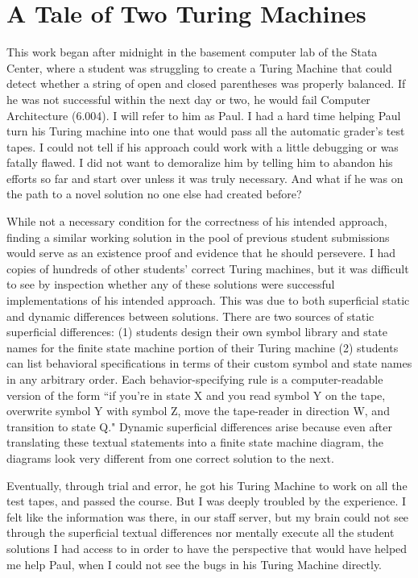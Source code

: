 \section{A Tale of Two Turing Machines}

This work began after midnight in the basement computer lab of the Stata Center, where a student was struggling to create a Turing Machine that could detect whether a string of open and closed parentheses was properly balanced. If he was not successful within the next day or two, he would fail Computer Architecture (6.004). I will refer to him as Paul. I had a hard time helping Paul turn his Turing machine into one that would pass all the automatic grader's test tapes. I could not tell if his approach could work with a little debugging or was fatally flawed. I did not want to demoralize him by telling him to abandon his efforts so far and start over unless it was truly necessary. And what if he was on the path to a novel solution no one else had created before?

While not a necessary condition for the correctness of his intended approach, finding a similar working solution in the pool of previous student submissions would serve as an existence proof and evidence that he should persevere. I had copies of hundreds of other students' correct Turing machines, but it was difficult to see by inspection whether any of these solutions were successful implementations of his intended approach. This was due to both superficial static and dynamic differences between solutions. There are two sources of static superficial differences: (1) students design their own symbol library and state names for the finite state machine portion of their Turing machine (2) students can list behavioral specifications in terms of their custom symbol and state names in any arbitrary order. Each behavior-specifying rule is a computer-readable version of the form ``if you're in state X and you read symbol Y on the tape, overwrite symbol Y with symbol Z, move the tape-reader in direction W, and transition to state Q." Dynamic superficial differences arise because even after translating these textual statements into a finite state machine diagram, the diagrams look very different from one correct solution to the next.

Eventually, through trial and error, he got his Turing Machine to work on all the test tapes, and passed the course. But I was deeply troubled by the experience. I felt like the information was there, in our staff server, but my brain could not see through the superficial textual differences nor mentally execute all the student solutions I had access to in order to have the perspective that would have helped me help Paul, when I could not see the bugs in his Turing Machine directly.

